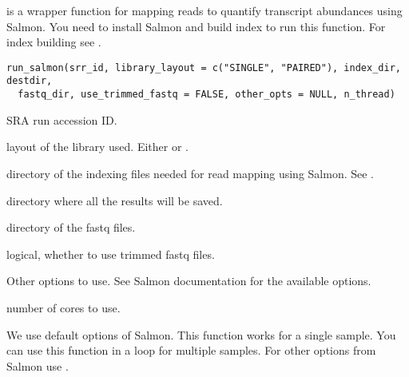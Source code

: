 \documentclass[letterpaper]{book}
\begin{document}
%
\begin{Description}\relax
{} is a wrapper function for mapping reads to quantify transcript abundances using Salmon. You need to install Salmon and build index to run this function. 
For index building see .
\end{Description}
%
\begin{Usage}
\begin{verbatim}
run_salmon(srr_id, library_layout = c("SINGLE", "PAIRED"), index_dir, destdir,
  fastq_dir, use_trimmed_fastq = FALSE, other_opts = NULL, n_thread)
\end{verbatim}
\end{Usage}
%
\begin{Arguments}
\begin{ldescription}
\item[\code{srr\_id}] SRA run accession ID.

\item[\code{library\_layout}] layout of the library used. Either  or .

\item[\code{index\_dir}] directory of the indexing files needed for read mapping using Salmon. See .

\item[\code{destdir}] directory where all the results will be saved.

\item[\code{fastq\_dir}] directory of the fastq files.

\item[\code{use\_trimmed\_fastq}] logical, whether to use trimmed fastq files.

\item[\code{other\_opts}] Other options to use. See Salmon documentation for the available options.

\item[\code{n\_thread}] number of cores to use.
\end{ldescription}
\end{Arguments}
%
\begin{Details}\relax
{} We use default options of Salmon. This function works for a single sample. You can use this function in a loop for multiple samples. 
For other options from Salmon use .
\end{Details}
\end{document}
